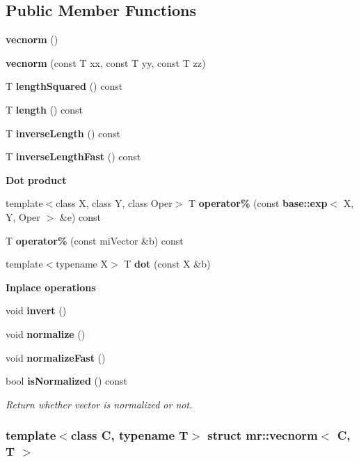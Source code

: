 \subsection*{Public Member Functions}
\begin{CompactItemize}
\item 
{\bf vecnorm} ()
\item 
{\bf vecnorm} (const T xx, const T yy, const T zz)
\item 
T {\bf length\-Squared} () const 
\item 
T {\bf length} () const 
\item 
T {\bf inverse\-Length} () const 
\item 
T {\bf inverse\-Length\-Fast} () const 
\end{CompactItemize}
\begin{Indent}{\bf Dot product}\par
\begin{CompactItemize}
\item 
template$<$class X, class Y, class Oper$>$ T {\bf operator\%} (const {\bf base::exp}$<$ X, Y, Oper $>$ \&e) const 
\item 
T {\bf operator\%} (const mi\-Vector \&b) const 
\item 
template$<$typename X$>$ T {\bf dot} (const X \&b)
\end{CompactItemize}
\end{Indent}
\begin{Indent}{\bf Inplace operations}\par
\begin{CompactItemize}
\item 
void {\bf invert} ()
\item 
void {\bf normalize} ()
\item 
void {\bf normalize\-Fast} ()
\item 
bool {\bf is\-Normalized} () const 
\begin{CompactList}\small\item\em Return whether vector is normalized or not. \item\end{CompactList}\end{CompactItemize}
\end{Indent}
\subsubsection*{template$<$class C, typename T$>$ struct mr::vecnorm$<$ C, T $>$}



